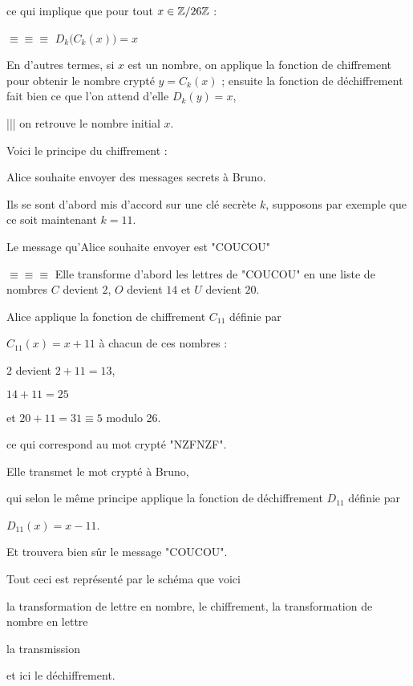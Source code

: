 \change

ce qui implique que pour tout 
$x \in \mathbb{Z}/26 \mathbb{Z}$ :

$\equiv \equiv \equiv$ $D_k \big( C_k(x) \big) = x$

\change

En d'autres termes, si $x$ est un nombre, on applique la fonction de chiffrement 
pour obtenir le nombre crypté $y=C_k(x)$ ; ensuite 
la fonction de déchiffrement fait bien ce que l'on attend d'elle 
$D_k(y)=x$, 

||| on retrouve le nombre initial $x$.



\diapo

Voici le principe du chiffrement : 

\change
Alice souhaite envoyer des messages secrets à Bruno.

\change
Ils se sont d'abord mis d'accord sur une clé secrète $k$, supposons par exemple que ce soit maintenant $k=11$.

\change
Le message qu'Alice souhaite envoyer est "COUCOU"

\change
$\equiv \equiv \equiv$ Elle transforme d'abord les lettres de "COUCOU" en une liste de nombres $C$ devient $2$, $O$ devient $14$ et $U$ devient $20$.

\change
Alice applique la fonction de chiffrement $C_{11}$ définie par 

$C_{11}(x)=x+11$ à chacun de ces nombres :

$2$ devient $2+11=13$, 

$14+11=25$ 

et $20+11=31 \equiv 5$ modulo 26.

\change
ce qui correspond au mot crypté "NZFNZF".

Elle transmet le mot crypté à Bruno, 


\change
qui selon le même principe 
applique la fonction de déchiffrement $D_{11}$ définie par 

$D_{11}(x)=x-11$.

Et trouvera bien sûr le message "COUCOU".

\change 

Tout ceci est représenté par le schéma que voici

la transformation de lettre en nombre, le chiffrement, la transformation de nombre en lettre


la transmission

et ici le déchiffrement.

